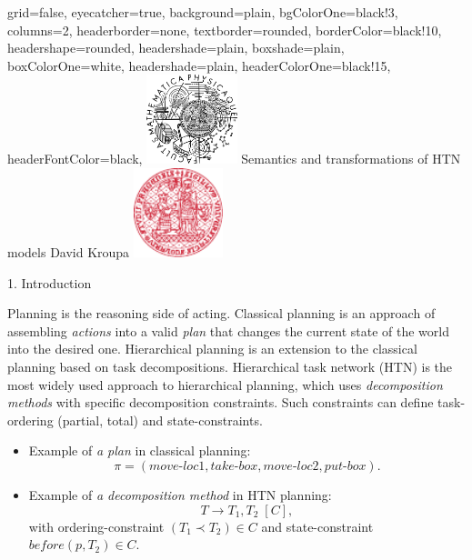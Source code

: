 \documentclass[portrait,a0paper,fontscale=0.25]{baposter}
\begin{document}
\color{black!80} %
\begin{poster}{grid=false,
	eyecatcher=true,
	background=plain,
	bgColorOne=black!3, %
	columns=2,
	headerborder=none,
        textborder=rounded, %
        borderColor=black!10,
	headershape=rounded, %
	headershade=plain,
	boxshade=plain,
	boxColorOne=white,
	headershade=plain,
	headerColorOne=black!15, %
	headerFontColor=black,
	}%
	{\includegraphics[height=7em]{logos/mff-black.pdf}}
	{Semantics and transformations of HTN models}
	{\vspace{1ex} David Kroupa}
	{\includegraphics[height=7em]{logos/uk-red.pdf}}


%
%

\begin{posterbox}[column=0,name=intro]{1. Introduction}

Planning is the reasoning side of acting. Classical planning is an approach of assembling \emph{actions} into a valid \emph{plan} that changes the current state of the world into the desired one. Hierarchical planning is an extension to the classical planning based on task decompositions. Hierarchical task network (HTN) is the most widely used approach to hierarchical planning, which uses \emph{decomposition methods} with specific decomposition constraints. Such constraints can define task-ordering (partial, total) and state-constraints.

\begin{itemize}
    \item Example of \emph{a plan} in classical planning:
    $$ \pi = (move\text{-}loc1, take\text{-}box, move\text{-}loc2, put\text{-}box). $$
    
    \item Example of \emph{a decomposition method} in HTN planning:
    $$ T \rightarrow T_1, T_2 \; [C],$$ with ordering-constraint $(T_1 \prec T_2) \in C$ and state-constraint $be\!f\!ore(p, T_2) \in C$.


\end{itemize}
\end{posterbox}
\end{poster}
\end{document}
